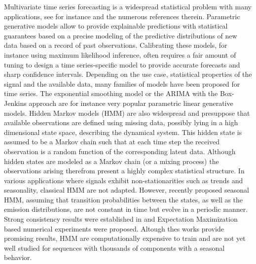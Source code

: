 \documentclass[letterpaper]{article} %
\begin{document}
Multivariate time series forecasting is a widespread statistical problem with  many applications, see for instance \citep{sarkka2013bayesian, douc2014nonlinear, zucchini2017hidden} and the numerous references therein.
 Parametric generative models allow to provide explainable predictions with statistical guarantees based on a precise modeling of the predictive distributions of new data based on a record of past observations. %
Calibrating these models, for instance using maximum likelihood inference, often requires a fair amount of tuning to design a time series-specific model to provide  accurate forecasts and sharp confidence intervals.  Depending on the use case, statistical properties of the signal and the available data, many families of models have been proposed for time series.  The exponential smoothing model \citep{RePEc:inm:oropre:v:9:y:1961:i:5:p:673-685} or the ARIMA with the Box-Jenkins approach \citep{box2015time} are for instance very popular parametric linear generative models.  Hidden Markov models (HMM) are also widespread and presuppose that available observations are defined using missing data, possibly lying in a high dimensional state space, describing the dynamical system. This hidden state is assumed to be a Markov chain such that at each time step the received observation is a random function of the corresponding latent data.  Although hidden states are modeled as a Markov chain (or a mixing process)  the observations arising therefrom present a highly complex statistical structure. %
 In various applications where signals exhibit non-stationarities such as trends and seasonality, classical HMM are not adapted. However, \citep{touron2017modeling}  recently proposed seasonal HMM, assuming that transition probabilities between the states, as well as the emission distributions, are not constant in time but evolve in a periodic manner. Strong consistency results were established in \citep{touron2019consistency} and Expectation Maximization based numerical experiments were proposed.
Altough thes works provide promising results, HMM are computationally expensive to train and are not yet well studied for sequences with thousands of components with a seasonal behavior.
 
\end{document}
